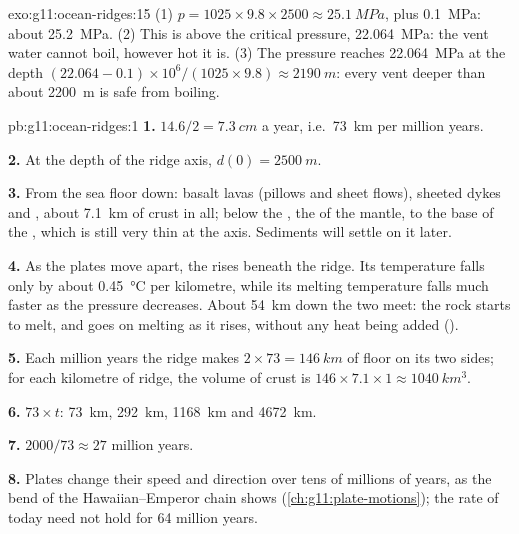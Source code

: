 \begin{solution}{exo:g11:ocean-ridges:15}
(1) $p = 1025 \times 9.8 \times 2500 \approx \qty{25.1}{MPa}$, plus
\qty{0.1}{MPa}: about \qty{25.2}{MPa}. (2) This is above the critical
pressure, \qty{22.064}{MPa}: the vent water cannot boil, however hot it is.
(3) The pressure reaches \qty{22.064}{MPa} at the depth
$(22.064 - 0.1) \times 10^6/(1025 \times 9.8) \approx \qty{2190}{m}$: every
vent deeper than about \qty{2200}{m} is safe from boiling.
\end{solution}

\begin{solution}{pb:g11:ocean-ridges:1}
\textbf{1.} $14.6/2 = \qty{7.3}{cm}$ a year, i.e.\ \qty{73}{km} per million
years.

\textbf{2.} At the depth of the ridge axis, $d(0) = \qty{2500}{m}$.

\textbf{3.} From the sea floor down: basalt lavas (pillows and sheet flows),
sheeted dykes and , about \qty{7.1}{km} of crust in all; below the
, the  of the mantle, to the base of the , which is
still very thin at the axis. Sediments will settle on it later.

\textbf{4.} As the plates move apart, the  rises beneath the
ridge. Its temperature falls only by about \qty{0.45}{\celsius} per
kilometre, while its melting temperature falls much faster as the pressure
decreases. About \qty{54}{km} down the two meet: the rock starts to melt, and
goes on melting as it rises, without any heat being added ().

\textbf{5.} Each million years the ridge makes $2 \times 73 = \qty{146}{km}$
of floor on its two sides; for each kilometre of ridge, the volume of crust is
$146 \times 7.1 \times 1 \approx \qty{1040}{km^3}$.

\textbf{6.} $73 \times t$: \qty{73}{km}, \qty{292}{km}, \qty{1168}{km} and
\qty{4672}{km}.

\textbf{7.} $2000/73 \approx 27$ million years.

\textbf{8.} Plates change their speed and direction over tens of millions of
years, as the bend of the Hawaiian--Emperor chain shows
(\cref{ch:g11:plate-motions}); the rate of today need not hold for 64
million years.


\end{solution}
